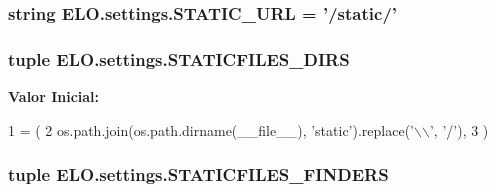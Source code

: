 \hypertarget{namespaceELO_1_1settings_a408323f388e22737eedf90471a3809a4}{
\subsubsection[{S\-T\-A\-T\-I\-C\-\_\-\-U\-R\-L}]{\setlength{\rightskip}{0pt plus 5cm}string E\-L\-O.\-settings.\-S\-T\-A\-T\-I\-C\-\_\-\-U\-R\-L = '/static/'}}\label{namespaceELO_1_1settings_a408323f388e22737eedf90471a3809a4}
\hypertarget{namespaceELO_1_1settings_aa2272e7a822b45c2101e4f5a958e22a6}{
\subsubsection[{S\-T\-A\-T\-I\-C\-F\-I\-L\-E\-S\-\_\-\-D\-I\-R\-S}]{\setlength{\rightskip}{0pt plus 5cm}tuple E\-L\-O.\-settings.\-S\-T\-A\-T\-I\-C\-F\-I\-L\-E\-S\-\_\-\-D\-I\-R\-S}}\label{namespaceELO_1_1settings_aa2272e7a822b45c2101e4f5a958e22a6}
{\bfseries Valor Inicial\-:}
\begin{DoxyCode}
1 = (
2     os.path.join(os.path.dirname(\_\_file\_\_), \textcolor{stringliteral}{'static'}).replace(\textcolor{stringliteral}{'\(\backslash\)\(\backslash\)'}, \textcolor{stringliteral}{'/'}),
3 )
\end{DoxyCode}
\hypertarget{namespaceELO_1_1settings_a3e4decd51fab7bd5bdbdb12aac13b70a}{
\subsubsection[{S\-T\-A\-T\-I\-C\-F\-I\-L\-E\-S\-\_\-\-F\-I\-N\-D\-E\-R\-S}]{\setlength{\rightskip}{0pt plus 5cm}tuple E\-L\-O.\-settings.\-S\-T\-A\-T\-I\-C\-F\-I\-L\-E\-S\-\_\-\-F\-I\-N\-D\-E\-R\-S}}\label{namespaceELO_1_1settings_a3e4decd51fab7bd5bdbdb12aac13b70a}

